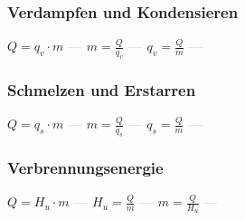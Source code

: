 \subsubsection{Verdampfen und Kondensieren} 
\begin{minipage}{0.45\textwidth} 
\end{minipage} 
\begin{minipage}{0.45\textwidth} 
 
\end{minipage} 
$ Q =q_{v} \cdot m $ \textcolor{lightgray}{\textbf{---}} 
$ m = \frac{Q}{q_{v} } $ \textcolor{lightgray}{\textbf{---}} 
$ q_{v}  = \frac{Q}{m} $ \textcolor{lightgray}{\textbf{---}} 

\subsubsection{Schmelzen und Erstarren} 
\begin{minipage}{0.45\textwidth} 
\end{minipage} 
\begin{minipage}{0.45\textwidth} 
 
\end{minipage} 
$ Q = q_{s} \cdot m $ \textcolor{lightgray}{\textbf{---}} 
$ m = \frac{Q}{q_{s} } $ \textcolor{lightgray}{\textbf{---}} 
$ q_{s}  = \frac{Q}{m} $ \textcolor{lightgray}{\textbf{---}} 

\subsubsection{Verbrennungsenergie} 
\begin{minipage}{0.45\textwidth} 
\end{minipage} 
\begin{minipage}{0.45\textwidth} 
 
\end{minipage} 
$ Q = H_{u} \cdot m $ \textcolor{lightgray}{\textbf{---}} 
$ H_{u}  = \frac{Q}{m} $ \textcolor{lightgray}{\textbf{---}} 
$ m = \frac{Q}{H_{u} } $ \textcolor{lightgray}{\textbf{---}} 

